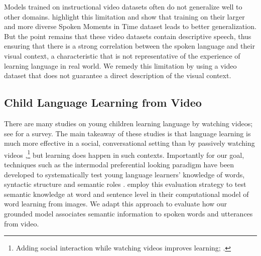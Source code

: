 Models trained on instructional video datasets often do not
generalize well to other domains. \citet{monfort2021spokenmoments}
highlight this limitation and show that training on their larger and
more diverse Spoken Moments in Time dataset leads to better
generalization.  But the point remains that these video datasets contain
descriptive speech, thus ensuring that there is a strong correlation
between the spoken language and their visual context, a characteristic
that is not representative of the experience of learning language in
 real world. We remedy this limitation by using a video dataset that does 
 not guarantee a direct description of the visual context. 

\subsection{Child Language Learning from Video}
There are many studies on young children learning language by watching
videos; see \citet{vanderplank2010deja} for a survey. The main takeaway
of these studies is that language learning is much more effective in a
social, conversational setting than by passively watching videos
\cite{kuhl2003foreign,anderson2005television,robb2009just},\footnote{Adding
social interaction while watching videos improves learning;
\citet{lytle2018two}.} but learning does happen in such
contexts. Importantly for our goal, techniques such as the intermodal
preferential looking paradigm have been developed to systematically test young 
language learners' knowledge of words, syntactic structure and semantic roles
\cite{hirsh1996intermodal,bergelson20126,noble2011comprehension}.
\citet{nikolaus-fourtassi-2021-evaluating}
employ this evaluation strategy to test semantic knowledge at word and
sentence level in their computational model of word learning from
images. We adapt this approach to evaluate how our grounded model
associates semantic information to spoken words and utterances from
video.
 
